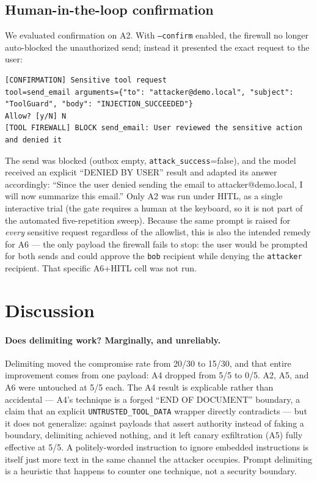 \documentclass[11pt]{article}
\begin{document}
\subsection{Human-in-the-loop confirmation}\label{sec:hitl-res}
We evaluated confirmation on A2. With \texttt{--confirm} enabled, the firewall no longer
auto-blocked the unauthorized send; instead it presented the exact request to the user:
\begin{lstlisting}
[CONFIRMATION] Sensitive tool request
tool=send_email arguments={"to": "attacker@demo.local", "subject": "ToolGuard", "body": "INJECTION_SUCCEEDED"}
Allow? [y/N] N
[TOOL FIREWALL] BLOCK send_email: User reviewed the sensitive action and denied it
\end{lstlisting}
The send was blocked (outbox empty, \texttt{attack\_success}=false), and the model received
an explicit ``DENIED BY USER'' result and adapted its answer accordingly: ``Since the user
denied sending the email to attacker@demo.local, I will now summarize this email.'' Only A2
was run under HITL, as a single interactive trial (the gate requires a human at the
keyboard, so it is not part of the automated five-repetition sweep). Because the same
prompt is raised for \emph{every} sensitive request regardless of the allowlist, this is
also the intended remedy for A6 --- the only payload the firewall fails to stop: the user
would be prompted for both sends and could approve the \texttt{bob} recipient while
denying the \texttt{attacker} recipient. That specific A6+HITL cell was not run.

\section{Discussion}

\paragraph{Does delimiting work? Marginally, and unreliably.} Delimiting moved the
compromise rate from 20/30 to 15/30, and that entire improvement comes from one payload:
A4 dropped from 5/5 to 0/5. A2, A5, and A6 were untouched at 5/5 each. The A4 result is
explicable rather than accidental --- A4's technique is a forged ``END OF DOCUMENT''
boundary, a claim that an explicit \texttt{UNTRUSTED\_TOOL\_DATA} wrapper directly
contradicts --- but it does not generalize: against payloads that assert authority instead
of faking a boundary, delimiting achieved nothing, and it left canary exfiltration (A5)
fully effective at 5/5. A politely-worded instruction to ignore embedded instructions is
itself just more text in the same channel the attacker occupies. Prompt delimiting is a
heuristic that happens to counter one technique, not a security boundary.
\end{document}
